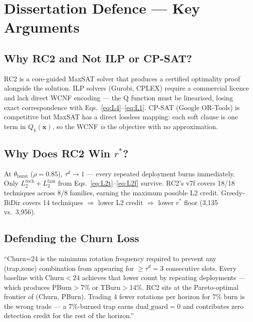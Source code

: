 \documentclass[12pt,a4paper]{article}
\newcommand{\rstar}{r^*}
\newcommand{\xvec}{\mathbf{x}}
\newcommand{\Qkx}{Q_k(\xvec)}
\newcommand{\dg}{\mathrm{dual\_guard}}
\newcommand{\taud}{\tau^d}
\begin{document}
\section{Dissertation Defence — Key Arguments}
\label{sec:defence}

\subsection{Why RC2 and Not ILP or CP-SAT?}

RC2 is a core-guided MaxSAT solver that produces a certified optimality proof alongside
the solution. ILP solvers (Gurobi, CPLEX) require a commercial licence and lack direct
WCNF encoding — the Q function must be linearised, losing exact correspondence with
Eqs.~\eqref{eq:L4}--\eqref{eq:L1}. CP-SAT (Google OR-Tools) is competitive but MaxSAT
has a direct lossless mapping: each soft clause is one term in $\Qkx$, so the WCNF
\emph{is} the objective with no approximation.

\subsection{Why Does RC2 Win $r^*$?}

At $\theta_{\mathrm{burst}}$ ($\rho{=}0.85$), $\taud{\to}1$ — every repeated deployment
burns immediately. Only $L_2^{\mathrm{tech}} + L_2^{\mathrm{fam}}$ from
Eqs.~\eqref{eq:L2t}--\eqref{eq:L2f} survive. RC2's v7f covers 18/18 techniques across
8/8 families, earning the maximum possible L2 credit. Greedy-BiDir covers 14 techniques
$\Rightarrow$ lower L2 credit $\Rightarrow$ lower $\rstar$ floor (3,135 vs.\ 3,956).

\subsection{Defending the Churn Loss}

\begin{defence}
``Churn=24 is the minimum rotation frequency required to prevent any (trap,zone)
combination from appearing for $\ge\tau^d{=}3$ consecutive slots. Every baseline with
Churn$<$24 achieves that lower count by repeating deployments — which produces
PBurn$>$7\% or TBurn$>$14\%. RC2 sits at the Pareto-optimal frontier of (Churn, PBurn).
Trading 4 fewer rotations per horizon for 7\% burn is the wrong trade — a 7\%-burned trap
earns $\dg{=}0$ and contributes zero detection credit for the rest of the horizon.''
\end{defence}
\end{document}
